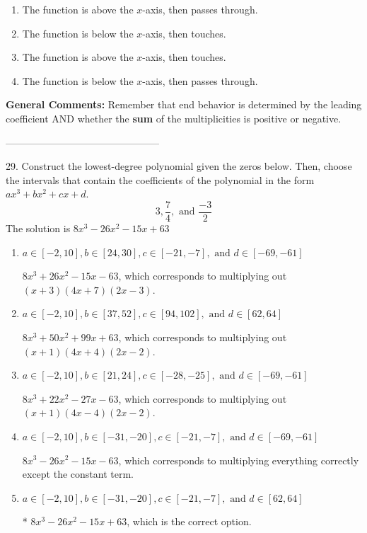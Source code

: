 \documentclass{extbook}[14pt]
\begin{document}
\begin{enumerate}[label=\Alph*.] 
\item The function is above the $x$-axis, then passes through.  
\item The function is below the $x$-axis, then touches.  
\item The function is above the $x$-axis, then touches.  
\item The function is below the $x$-axis, then passes through.  
\end{enumerate} 
 
\textbf{General Comments:} Remember that end behavior is determined by the leading coefficient AND whether the \textbf{sum} of the multiplicities is positive or negative.

-----------------------------------------------

29. Construct the lowest-degree polynomial given the zeros below. Then, choose the intervals that contain the coefficients of the polynomial in the form $ax^3+bx^2+cx+d$.
\[ 3, \frac{7}{4}, \text{ and } \frac{-3}{2} \] 
The solution is $ 8x^{3} -26 x^{2} -15 x + 63 $ 

\begin{enumerate}[label=\Alph*.] 
\item $ a \in [-2, 10], b \in [24, 30], c \in [-21, -7], \text{ and } d \in [-69, -61] $ 

 $8x^{3} +26 x^{2} -15 x -63$, which corresponds to multiplying out $(x + 3)(4x + 7)(2x -3)$. 
\item $ a \in [-2, 10], b \in [37, 52], c \in [94, 102], \text{ and } d \in [62, 64] $ 

 $8x^{3} +50 x^{2} +99 x + 63$, which corresponds to multiplying out $(x + 1)(4x + 4)(2x -2)$. 
\item $ a \in [-2, 10], b \in [21, 24], c \in [-28, -25], \text{ and } d \in [-69, -61] $ 

 $8x^{3} +22 x^{2} -27 x -63$, which corresponds to multiplying out $(x + 1)(4x -4)(2x -2)$. 
\item $ a \in [-2, 10], b \in [-31, -20], c \in [-21, -7], \text{ and } d \in [-69, -61] $ 

 $8x^{3} -26 x^{2} -15 x -63$, which corresponds to multiplying everything correctly except the constant term. 
\item $ a \in [-2, 10], b \in [-31, -20], c \in [-21, -7], \text{ and } d \in [62, 64] $ 

 * $8x^{3} -26 x^{2} -15 x + 63$, which is the correct option. 
\end{enumerate} 
 
\end{document}
